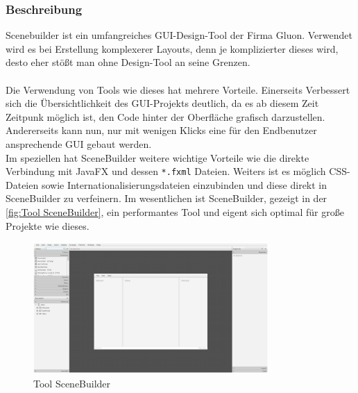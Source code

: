 \subsubsection{Beschreibung}
Scenebuilder ist ein umfangreiches GUI-Design-Tool der Firma Gluon.
Verwendet wird es bei Erstellung komplexerer Layouts, denn je komplizierter dieses wird, desto eher stößt man ohne Design-Tool an seine Grenzen.\\\\
Die Verwendung von Tools wie dieses hat mehrere Vorteile.
Einerseits Verbessert sich die Übersichtlichkeit des GUI-Projekts deutlich, da es ab diesem Zeit Zeitpunk möglich ist, den Code hinter der Oberfläche grafisch darzustellen.
Andererseits kann nun, nur mit wenigen Klicks eine für den Endbenutzer ansprechende GUI gebaut werden.\\
Im speziellen hat SceneBuilder weitere wichtige Vorteile wie die direkte Verbindung mit JavaFX und dessen \lstinline{*.fxml} Dateien.
Weiters ist es möglich CSS-Dateien sowie Internationalisierungsdateien einzubinden und diese direkt in SceneBuilder zu verfeinern.
Im wesentlichen ist SceneBuilder, gezeigt in der \autoref{fig:Tool SceneBuilder}, ein performantes Tool und eigent sich optimal für große Projekte wie dieses.
\begin{figure}[htb!]
    \centering
    \includegraphics[width=0.8\textwidth]{fig/ainf/SceneBuilder.png}
    \caption{Tool SceneBuilder}
    \label{fig:Tool SceneBuilder}
\end{figure}
